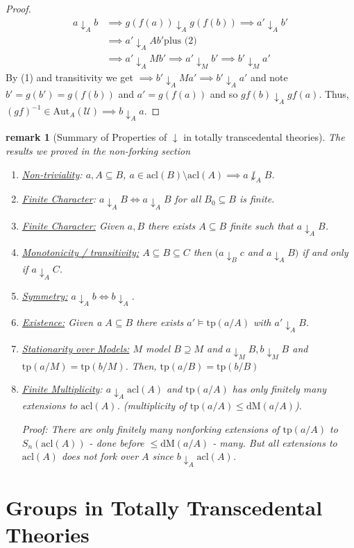 \documentclass[letterpaper, 12pt]{article}
\newcommand{\fin}{\qquad \quad \hfill \framebox[1.75mm][l]{\,}}
\newcommand{\cU}{\mathcal{U}}
\newcommand{\Aut}{\mbox{Aut}}
\newcommand{\tp}{\mbox{tp}}
\newcommand{\dM}{\mbox{dM}}
\newcommand{\acl}{\mbox{acl}}
\newcommand{\da}{\downarrow}
\theoremstyle{stdthm}
\theoremstyle{stddef}
\newtheorem{rem}[thm]{remark} %
\theoremstyle{stdnonum}
\theoremstyle{stdqands}
\theoremstyle{stdbold}
\begin{document}
\begin{proof}
\begin{align*}
a \da_A b &\implies g(f(a)) \da_A g(f(b)) \implies a' \da_A b'\\
& \implies a' \da_A Ab' \mbox{plus (2)}\\
& \implies a' \da_A Mb' \implies a' \da_M b' \implies b' \da_M a'
\end{align*}
By (1) and transitivity we get $\implies b' \da_A Ma' \implies b' \da_A a'$ and note $b' = g(b') = g(f(b))$ and $a' = g(f(a))$ and so $gf(b) \da_A gf(a)$. Thus, $(gf)^{-1} \in \Aut_A (\cU) \implies b \da_A a$.  
\end{proof}

\begin{rem}[Summary of Properties of $\da$ in totally transcedental theories]
The results we proved in the non-forking section
\begin{enumerate}
\item \underline{Non-triviality}: $a,A \subseteq B$, $a \in \acl(B) \setminus \acl(A) \implies a \not \downarrow_A B$. 
\item \underline{Finite Character}: $a \da_A B \iff a \da_A B$ for all $B_0 \subseteq B$ is finite. 
\item \underline{Finite Character:} Given $a,B$ there exists $A \subseteq B$ finite such that $a \da_A B$. 
\item \underline{Monotonicity / transitivity:} $A \subseteq B \subseteq C$ then $(a \da_B c $ and $a \da_A B )$ if and only if $a \da_A C$. 
\item \underline{Symmetry:} $a \da_A b \iff b \da_A$. 
\item \underline{Existence:} Given a $A\subseteq B$ there exists $a' \models \tp(a/A)$ with $a' \da_A B$. 
\item \underline{Stationarity over Models:} $M$ model $B \supseteq M$ and $a \da_M B, b \da_M B$ and $\tp(a/M) = \tp(b/M)$. Then, $\tp(a/B) = \tp(b/B)$ \item \underline{Finite Multiplicity}: $a \da_A \acl(A)$ and $\tp(a/A)$ has only finitely many extensions to $\acl(A)$. (multiplicity of $\tp(a/A) \leq \dM(a/A)$).   

 Proof: There are only finitely many nonforking extensions of $\tp(a/A)$ to $S_n(\acl(A))$ - done before $\leq \dM(a/A)$ - many. But all extensions to $\acl(A)$ does not fork over $A$ since $b \da_A \acl(A)$. 
\end{enumerate}
\end{rem}
\newpage

\section{Groups in Totally Transcedental Theories}
\end{document}
